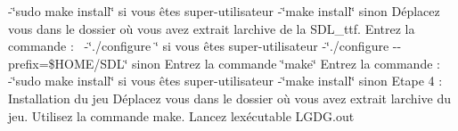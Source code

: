  -\/\char`\"{}sudo make install\char`\"{} si vous êtes super-\/utilisateur -\/\char`\"{}make install\char`\"{} sinon Déplacez vous dans le dossier où vous avez extrait l\textquotesingle{}archive de la S\+D\+L\+\_\+ttf. Entrez la commande \+:~\newline
 -\/\char`\"{}./configure \char`\"{} si vous êtes super-\/utilisateur -\/\char`\"{}./configure -\/-\/prefix=\$\+H\+O\+M\+E/\+S\+D\+L\char`\"{} sinon Entrez la commande \char`\"{}make\char`\"{} Entrez la commande \+:~\newline
 -\/\char`\"{}sudo make install\char`\"{} si vous êtes super-\/utilisateur -\/\char`\"{}make install\char`\"{} sinon Etape 4 \+: Installation du jeu Déplacez vous dans le dossier où vous avez extrait l\textquotesingle{}archive du jeu. Utilisez la commande make. Lancez l\textquotesingle{}exécutable L\+G\+D\+G.\+out 